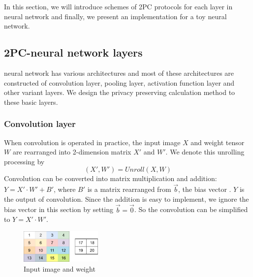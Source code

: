 \documentclass[letterpaper]{article} %
\begin{document}
       In this section, we will introduce schemes
       of 2PC protocols for each layer in neural network
       and finally, we present an implementation for a toy neural network.
       

    \subsection{2PC-neural network layers}
    
    neural network has various architectures and 
    most of these architectures are constructed of convolution layer, 
    pooling layer, activation function layer and other variant layers. 
    We design the privacy preserving calculation method to these basic layers.
    
    \subsubsection{Convolution layer}


    When convolution is operated in practice,
    the input image $X$ and weight tensor $W$ 
    are rearranged into 2-dimension matrix $X'$ and $W'$. 
    We denote this unrolling processing by 
    $$(X',W')=Unroll(X,W)$$
    Convolution can be converted into matrix multiplication and addition:
    $Y=X'\cdot W'+B'$, where $B'$ is a matrix rearranged from $\overrightarrow{b}$, the bias vector . 
    $Y$ is the output of convolution.
    Since the addition is easy to implement, we ignore the bias vector in this section by setting $\overrightarrow{b}=\overrightarrow{0}$.
    So the convolution can be simplified to $Y=X'\cdot W'$.






    \begin{figure}[htbp]
        \centering
        \includegraphics[width=4cm]{new_unrolling.png}
        \caption{Input image and weight}
        \label{input image and weight}
    \end{figure}
    
\end{document}
